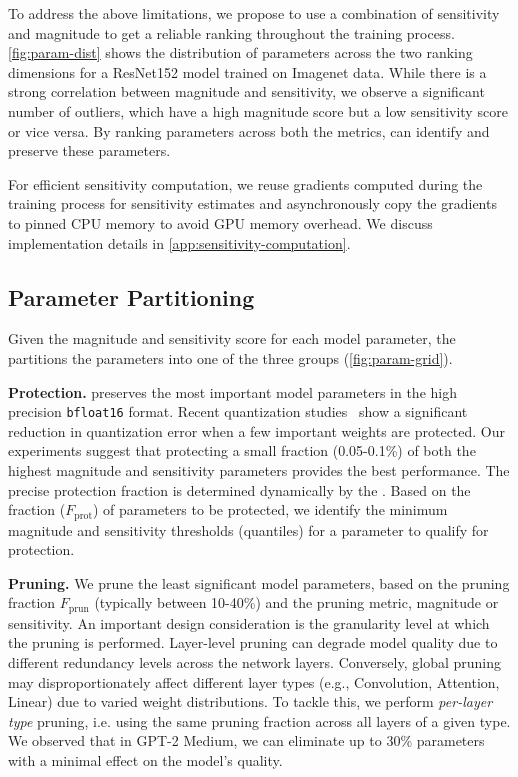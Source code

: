 To address the above limitations, we propose to use a combination of sensitivity and magnitude to get a reliable ranking throughout the training process. \cref{fig:param-dist} shows the distribution of parameters across the two ranking dimensions for a ResNet152 model trained on Imagenet data. While there is a strong correlation between magnitude and sensitivity, we observe a significant number of outliers, which have a high magnitude score but a low sensitivity score or vice versa. By ranking parameters across both the metrics, \sys can identify and preserve these parameters.




For efficient sensitivity computation, we reuse gradients computed during the training process for sensitivity estimates and asynchronously copy the gradients to pinned CPU memory to avoid GPU memory overhead. We discuss implementation details in \cref{app:sensitivity-computation}. 




\subsection{Parameter Partitioning}
\label{sec:pruneandprotect}

Given the magnitude and sensitivity score for each model parameter, the \quantizer partitions the parameters into one of the three groups (\cref{fig:param-grid}). 

\noindent\textbf{Protection.}
\sys preserves the most important model parameters in the high precision \texttt{bfloat16} format.
Recent quantization studies~\cite{llm-int8, dash2020hessian} show a significant reduction in quantization error when a few important weights are protected. Our experiments suggest that protecting a small fraction (0.05-0.1\%) of both the highest magnitude and sensitivity parameters provides the best performance. The precise protection fraction is determined dynamically by the \qcm. Based on the fraction ($F_{\text{prot}}$) of parameters to be protected, we identify the minimum magnitude and sensitivity thresholds (quantiles) for a parameter to qualify for protection. 



\noindent\textbf{Pruning.} We prune the least significant model parameters, based on the pruning fraction $F_{\text{prun}}$ (typically between 10-40\%) and the pruning metric, magnitude or sensitivity. An important design consideration is the granularity level at which the pruning is performed. Layer-level pruning can degrade model quality due to different redundancy levels across the network layers.  Conversely, global pruning may disproportionately affect different layer types (e.g., Convolution, Attention, Linear) due to varied weight distributions. To tackle this, we perform {\em per-layer type} pruning, i.e. using the same pruning fraction across all layers of a given type. We observed that in GPT-2 Medium, we can eliminate up to 30\% parameters with a minimal effect on the model's quality.









